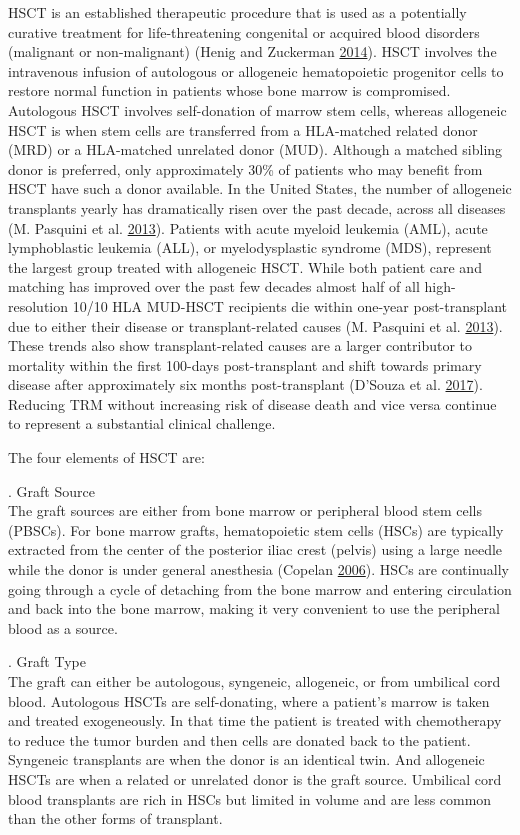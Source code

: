 \documentclass[]{DissertateOSU}
\begin{document}
HSCT is an established therapeutic procedure that is used as a
potentially curative treatment for life-threatening congenital or
acquired blood disorders (malignant or non-malignant) (Henig and
Zuckerman \protect\hyperlink{ref-Henig_2014}{2014}). HSCT involves the
intravenous infusion of autologous or allogeneic hematopoietic
progenitor cells to restore normal function in patients whose bone
marrow is compromised. Autologous HSCT involves self-donation of marrow
stem cells, whereas allogeneic HSCT is when stem cells are transferred
from a HLA-matched related donor (MRD) or a HLA-matched unrelated donor
(MUD). Although a matched sibling donor is preferred, only approximately
30\% of patients who may benefit from HSCT have such a donor available.
In the United States, the number of allogeneic transplants yearly has
dramatically risen over the past decade, across all diseases (M.
Pasquini et al. \protect\hyperlink{ref-Pasquini_2013}{2013}). Patients
with acute myeloid leukemia (AML), acute lymphoblastic leukemia (ALL),
or myelodysplastic syndrome (MDS), represent the largest group treated
with allogeneic HSCT. While both patient care and matching has improved
over the past few decades almost half of all high-resolution 10/10 HLA
MUD-HSCT recipients die within one-year post-transplant due to either
their disease or transplant-related causes (M. Pasquini et al.
\protect\hyperlink{ref-Pasquini_2013}{2013}). These trends also show
transplant-related causes are a larger contributor to mortality within
the first 100-days post-transplant and shift towards primary disease
after approximately six months post-transplant (D'Souza et al.
\protect\hyperlink{ref-DSouza_2017}{2017}). Reducing TRM without
increasing risk of disease death and vice versa continue to represent a
substantial clinical challenge.

\noindent The four elements of HSCT are:

. Graft Source\\
The graft sources are either from bone marrow or peripheral blood stem
cells (PBSCs). For bone marrow grafts, hematopoietic stem cells (HSCs)
are typically extracted from the center of the posterior iliac crest
(pelvis) using a large needle while the donor is under general
anesthesia (Copelan \protect\hyperlink{ref-copelan_2006}{2006}). HSCs
are continually going through a cycle of detaching from the bone marrow
and entering circulation and back into the bone marrow, making it very
convenient to use the peripheral blood as a source.

. Graft Type\\
The graft can either be autologous, syngeneic, allogeneic, or from
umbilical cord blood. Autologous HSCTs are self-donating, where a
patient's marrow is taken and treated exogeneously. In that time the
patient is treated with chemotherapy to reduce the tumor burden and then
cells are donated back to the patient. Syngeneic transplants are when
the donor is an identical twin. And allogeneic HSCTs are when a related
or unrelated donor is the graft source. Umbilical cord blood transplants
are rich in HSCs but limited in volume and are less common than the
other forms of transplant.
\end{document}
